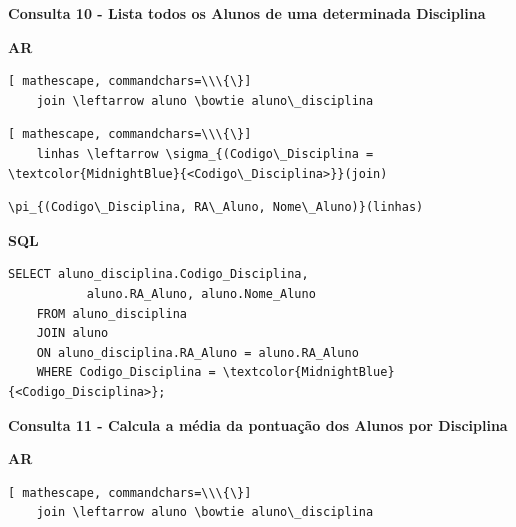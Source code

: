 \documentclass[12pt,a4paper]{article}
\begin{document}
\vspace{0.5cm}
\begin{center}
    \textbf{Consulta 10 - Lista todos os Alunos de uma determinada Disciplina }
\end{center}
\begin{center}
    \textbf{AR}
\end{center}

\begin{Verbatim}[ mathescape, commandchars=\\\{\}]
    join \leftarrow aluno \bowtie aluno\_disciplina 
\end{Verbatim}

\begin{Verbatim}[ mathescape, commandchars=\\\{\}]
    linhas \leftarrow \sigma_{(Codigo\_Disciplina = \textcolor{MidnightBlue}{<Codigo\_Disciplina>}}(join)
\end{Verbatim}

\begin{Verbatim}[mathescape, commandchars=\\\{\}]
    \pi_{(Codigo\_Disciplina, RA\_Aluno, Nome\_Aluno)}(linhas)
\end{Verbatim}


\begin{center}
    \textbf{SQL}
\end{center}
\begin{Verbatim}[commandchars=\\\{\}]
    SELECT aluno_disciplina.Codigo_Disciplina,
           aluno.RA_Aluno, aluno.Nome_Aluno
    FROM aluno_disciplina 
    JOIN aluno 
    ON aluno_disciplina.RA_Aluno = aluno.RA_Aluno
    WHERE Codigo_Disciplina = \textcolor{MidnightBlue}{<Codigo_Disciplina>};
\end{Verbatim}


\vspace{0.5cm}
\begin{center}
    \textbf{Consulta 11 - Calcula a média da pontuação dos Alunos por Disciplina }
\end{center}
\begin{center}
    \textbf{AR}
\end{center}

\begin{Verbatim}[ mathescape, commandchars=\\\{\}]
    join \leftarrow aluno \bowtie aluno\_disciplina
\end{Verbatim}
\end{document}
